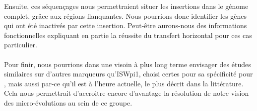 Ensuite, ces séquençages nous permettraient situer les insertions dans le génome complet, grâce aux régions flanquantes. 
Nous pourrions donc identifier les gènes qui ont été inactivés par cette insertion. Peut-être aurons-nous des informations fonctionnelles expliquant en partie la réussite du transfert horizontal pour ces cas particulier.

\paragraph{} %
\label{par:vide}
Pour finir, nous pourrions dans une visoin à plus long terme envisager des études similaires sur d'autres marqueurs qu'ISWpi1, choisi certes pour sa spécificité pour , mais aussi par-ce qu'il est à l'heure actuelle, le plus décrit dans la littérature. Cela nous permettrait d'accroitre encore d'avantage la résolution de notre vision des micro-évolutions au sein de ce groupe.


